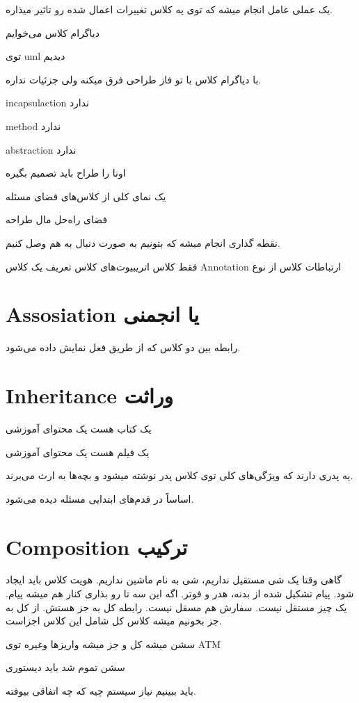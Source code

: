 یک عملی عامل انجام میشه که توی یه کلاس تغییرات اعمال شده رو تاثیر میذاره.

دیاگرام کلاس می‌خوایم

توی uml دیدیم

با دیاگرام کلاس با تو فاز طراحی فرق میکنه ولی جزئیات نداره.

incapsulaction ندارد

method ندارد

abstraction ندارد

اونا را طراح باید تصمیم بگیره

یک نمای کلی از کلاس‌های فضای مسئله

فضای راه‌حل مال طراحه

نقطه گذاری انجام میشه که بتونیم به صورت دنبال به هم وصل کنیم.

فقط کلاس
اتریبیوت‌های کلاس
تعریف یک کلاس Annotation
ارتباطات کلاس از نوع

\section{Assosiation یا انجمنی}

رابطه بین دو کلاس که از طریق فعل نمایش داده می‌شود.


\section{Inheritance وراثت}

یک کتاب هست یک محتوای آموزشی

یک فیلم هست یک محتوای آموزشی

یه پدری دارند که ویژگی‌های کلی توی کلاس پدر نوشته میشود و بچه‌ها به ارث می‌برند.

اساساً در قدم‌های ابتدایی مسئله دیده می‌شود.

\section{Composition ترکیب}

گاهی وقتا یک شی مستقیل نداریم، شی به نام ماشین نداریم. هویت کلاس باید ایجاد شود.
پیام تشکیل شده از بدنه، هدر و فوتر. اگه این سه تا رو بذاری کنار هم میشه پیام. یک
چیز مستقل نیست. سفارش هم مسقل نیست. رابطه کل به جز هستش. از کل به جز بخونیم میشه
کلاس کل شامل این کلاس اجزاست. 

سشن میشه کل و جز میشه واریزها وغیره توی ATM

سشن تموم شد باید دیستوری

باید ببینیم نیاز سیستم چیه که چه اتفاقی بیوفته.

